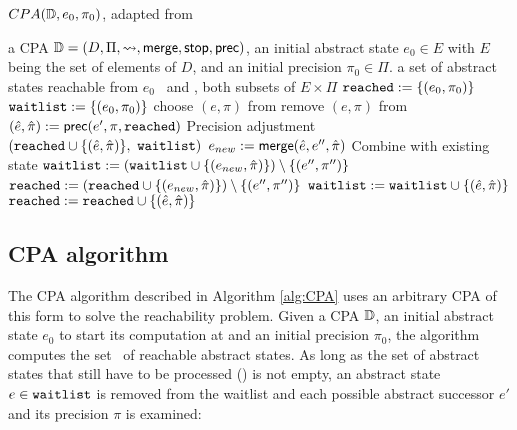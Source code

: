 \begin{algorithm}[t]
\caption{$CPA(\mathbb{D}, e_0, \pi_0)$, adapted from \cite{Beyer2008}}
\label{alg:CPA}
\begin{algorithmic}[1]

\Input a CPA $\mathbb{D} = (D, \Pi, \rightsquigarrow, \operatorname{\operatorname{\mathsf{merge}}}, \operatorname{\operatorname{\mathsf{stop}}}, \operatorname{\operatorname{\mathsf{prec}}})$,
	    an initial abstract state $e_0 \in E$ with $E$ being the set of elements of $D$,
	    and an initial precision $\pi_0 \in \Pi$.
\Output a set of abstract states reachable from $e_0$
\Variables \reachedSet\ and \waitlistSet , both subsets of $E \times \Pi$
\State $\texttt{reached} := \{ (e_0, \pi_0) \}$
\State $\texttt{waitlist} := \{ (e_0, \pi_0) \}$
\While{$\waitlistSet \neq \varnothing$}
	\State choose $(e, \pi)$ from \waitlistSet
	\State remove $(e, \pi)$ from \waitlistSet
		\State $(\hat{e}, \hat{\pi}) := \operatorname{\operatorname{\mathsf{prec}}}(e', \pi, \texttt{reached})$ \Comment Precision adjustment \label{alg:cpaPlus:precAdj}
		 \label{alg:cpa:isTarget}
			\State %
			\Return $(\reachedSet \cup \{ (\hat{e}, \hat{\pi}) \},\ \waitlistSet)$
		\EndIf
			\State $e_{new} := \operatorname{\operatorname{\mathsf{merge}}}(\hat{e}, e'', \hat{\pi})$ \Comment Combine with existing state \label{alg:cpa:mergeStart}
				\State $\texttt{waitlist} := (\texttt{waitlist} \cup \{ (e_{new}, \hat{\pi}) \}) \setminus \{ (e'',\pi '') \}$
				\State $\texttt{reached} := (\texttt{reached} \cup \{ (e_{new}, \hat{\pi}) \}) \setminus \{ (e'', \pi '') \}$
			\EndIf \label{alg:cpa:mergeStop}
		\EndFor
			\State $\texttt{waitlist} := \texttt{waitlist} \cup \{ (\hat{e}, \hat{\pi}) \}$
			\State $\texttt{reached} := \texttt{reached} \cup \{ (\hat{e}, \hat{\pi}) \}$
		\EndIf
	\EndFor
\EndWhile
\State %
\Return \reachedSet
\end{algorithmic}
\end{algorithm}

\subsection{CPA algorithm}
The CPA algorithm described in Algorithm \ref{alg:CPA} uses an arbitrary CPA of this form to solve the reachability problem.
Given a CPA $\mathbb{D}$, an initial abstract state $e_0$ to start its computation at and an initial precision $\pi_0$, the algorithm computes the set \reachedSet\ of reachable abstract states.
As long as the set of abstract states that still have to be processed (\waitlistSet) is not empty, an abstract state $e \in \texttt{waitlist}$ is removed from the waitlist
and each possible abstract successor $e'$ and its precision $\pi$ is examined:


